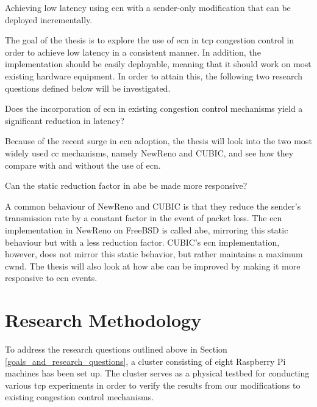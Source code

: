 \begin{statement}
    Achieving low latency using \gls{ecn} with a sender-only modification that can be deployed incrementally.
\end{statement}

The goal of the thesis is to explore the use of \gls{ecn} in \gls{tcp} congestion control in order to achieve low latency in a consistent manner. In addition, the implementation should be easily deployable, meaning that it should work on most existing hardware equipment. In order to attain this, the following two research questions defined below will be investigated.

\begin{statement}
    Does the incorporation of \gls{ecn} in existing congestion control mechanisms yield a significant reduction in latency?
\end{statement}

Because of the recent surge in \gls{ecn} adoption, the thesis will look into the two most widely used \gls{cc} mechanisms, namely NewReno and CUBIC, and see how they compare with and without the use of \gls{ecn}. 

\begin{statement}
    Can the static reduction factor in \gls{abe} be made more responsive?
\end{statement}

A common behaviour of NewReno and CUBIC is that they reduce the sender's transmission rate by a constant factor in the event of packet loss. The \gls{ecn} implementation in NewReno on FreeBSD is called \gls{abe}, mirroring this static behaviour but with a less  reduction factor. CUBIC's \gls{ecn} implementation, however, does not mirror this static behavior, but rather maintains a maximum \gls{cwnd}. The thesis will also look at how \gls{abe} can be improved by making it more responsive to \gls{ecn} events.









\section{Research Methodology}

To address the research questions outlined above in Section \ref{goals_and_research_questions}, a cluster consisting of eight Raspberry Pi machines has been set up. The cluster serves as a physical testbed for conducting various \gls{tcp} experiments in order to verify the results from our modifications to existing congestion control mechanisms.

